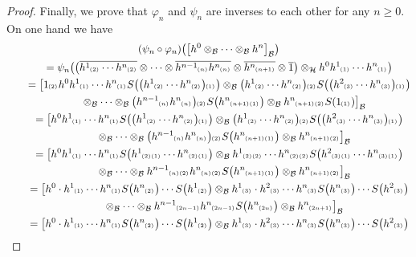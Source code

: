 \documentclass[pdftex]{sigma}
\numberwithin{equation}{section}
\newcommand{\ps}[1]{~\hspace{-4pt}_{^{(#1)}}}
\newcommand{\wbar}[1]{\overline{#1}}
\begin{document}
\begin{proof}
Finally, we prove that $\varphi_n$ and $\psi_n$ are inverses to each other for any $n\geq 0$.
On one hand we have
\begin{gather*}
(\psi_n \circ \varphi_n)\big(\big[h^0\otimes_{\cal B}\cdots\otimes_{\cal B} h^n\big]_{\cal B} \big)
\\
\qquad
=\psi_n\big(\big(\wbar{h^1\ps{2}\cdots h^n\ps{2}} \otimes\cdots\otimes \wbar{h^{n-1}\ps{n}h^n\ps{n}} \otimes
\wbar{h^n\ps{n+1}} \otimes \wbar{1}\big) \otimes_{\cal H} h^0h^1\ps{1}\cdots h^n\ps{1} \big)
\\
\qquad
=\big[1\ps{2}h^0h^1\ps{1}\cdots h^n\ps{1}S\big(\big(h^1\ps{2}\cdots h^n\ps{2}\big)\ps{1}\big)\otimes_{\cal B} \big(h^1\ps{2}\cdots
h^n\ps{2}\big)\ps{2}S\big(\big(h^2\ps{3}\cdots h^n\ps{3}\big)\ps{1}\big)
\\
\qquad\phantom{=}{}
\otimes_{\cal B}\cdots \otimes_{\cal B} \big(h^{n-1}\ps{n}h^n\ps{n}\big)\ps{2}S\big(h^n\ps{n+1}\ps{1}\big)\otimes_{\cal B}
h^n\ps{n+1}\ps{2}S(1\ps{1})\big]_{\cal B}
\\
\qquad
=\big[h^0h^1\ps{1}\cdots h^n\ps{1}S\big(\big(h^1\ps{2}\cdots h^n\ps{2}\big)\ps{1}\big)\otimes_{\cal B} \big(h^1\ps{2}\cdots
h^n\ps{2}\big)\ps{2}S\big(\big(h^2\ps{3}\cdots h^n\ps{3}\big)\ps{1}\big)
\\
\qquad\phantom{=}{}
\otimes_{\cal B}\cdots \otimes_{\cal B} \big(h^{n-1}\ps{n}h^n\ps{n}\big)\ps{2}S\big(h^n\ps{n+1}\ps{1}\big)\otimes_{\cal B}
h^n\ps{n+1}\ps{2}\big]_{\cal B}
\\
\qquad
=\big[h^0h^1\ps{1}\cdots h^n\ps{1}S\big(h^1\ps{2}\ps{1}\cdots h^n\ps{2}\ps{1}\big)\otimes_{\cal B} h^1\ps{2}\ps{2}\cdots
h^n\ps{2}\ps{2}S\big(h^2\ps{3}\ps{1}\cdots h^n\ps{3}\ps{1}\big)
\\
\qquad\phantom{=}{}
\otimes_{\cal B}\cdots \otimes_{\cal B} h^{n-1}\ps{n}\ps{2}h^n\ps{n}\ps{2}S\big(h^n\ps{n+1}\ps{1}\big)\otimes_{\cal B}
h^n\ps{n+1}\ps{2}\big]_{\cal B}
\\
\qquad
=\big[h^0\cdot h^1\ps{1}\cdots h^n\ps{1}S\big(h^n\ps{2}\big)\cdots S\big(h^1\ps{2}\big)\otimes_{\cal B} h^1\ps{3}\cdot
h^2\ps{3}\cdots h^n\ps{3}S\big(h^n\ps{3}\big)\cdots S\big(h^2\ps{3}\big)
\\
\qquad\phantom{=}{}
\otimes_{\cal B}\cdots \otimes_{\cal B} h^{n-1}\ps{2n-1}h^n\ps{2n-1}S\big(h^n\ps{2n}\big)\otimes_{\cal B} h^n\ps{2n+1}\big]_{\cal B}
\\
\qquad
=\big[h^0\cdot h^1\ps{1}\cdots h^n\ps{1}S\big(h^n\ps{2}\big)\cdots S\big(h^1\ps{2}\big)\otimes_{\cal B} h^1\ps{3}\cdot
h^2\ps{3}\cdots h^n\ps{3}S\big(h^n\ps{3}\big)\cdots S\big(h^2\ps{3}\big)
\\

\end{gather*}
\end{proof}
\end{document}
